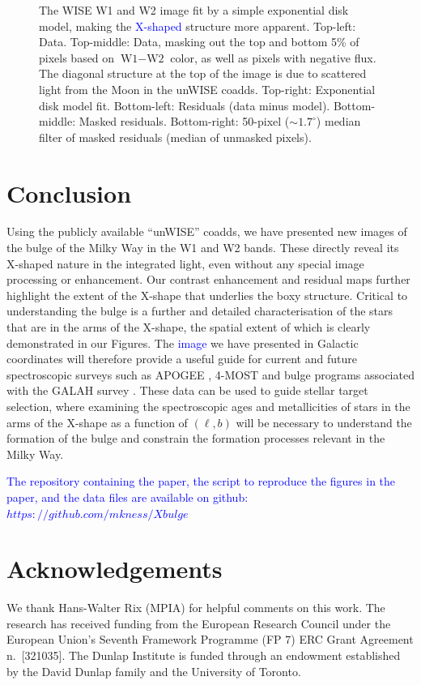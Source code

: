 \documentclass[12pt, preprint]{aastex}
\begin{document}
\begin{figure}[h!]
\caption{%
  The WISE W1 and W2 image fit by a simple exponential disk
  model, making the \textcolor{blue}{X-shaped} structure more apparent.
  Top-left: Data.  Top-middle: Data, masking out the top and bottom 5\%
  of pixels based on $\textrm{W1} - \textrm{W2}$ color, as well as pixels with negative flux.  The diagonal structure
  at the top of the image is due to scattered light from the Moon in the unWISE coadds.
  Top-right: Exponential disk model fit.
  Bottom-left: Residuals (data minus model).  Bottom-middle: Masked residuals.
  Bottom-right: 50-pixel ($\sim 1.7^{\circ}$) median filter of masked residuals (median of unmasked
  pixels).
  }
\label{fig:modfit}
\end{figure}




\section{Conclusion}

Using the publicly available ``unWISE'' coadds, we have presented new images of the bulge of the Milky Way in the W1 and W2 bands.  These directly reveal its X-shaped nature in the integrated light, even without any special image processing or enhancement. Our contrast enhancement and residual maps further highlight the extent of the X-shape that underlies the boxy structure. Critical to understanding the bulge is a further and detailed characterisation of the stars that are in the arms of the X-shape, the spatial extent of which is clearly demonstrated in our Figures. The \textcolor{blue}{image} we have presented in Galactic coordinates will therefore provide a useful guide for current and future spectroscopic surveys such as APOGEE \citep{Majewski2015}, 4-MOST \citep{4most} and bulge programs associated with the GALAH survey \citep{deSilva2015}. These data can be used to guide stellar target selection, where examining the spectroscopic ages \citep[e.g.][]{Martig2016, Ness2016} and metallicities of stars in the arms of the X-shape as a function of $(\ell,b)$ will be necessary to understand the formation of the bulge and constrain the formation processes relevant in the Milky Way. 

\textcolor{blue}{The repository containing the paper, the script to reproduce the figures in the paper, and the data files are available on github: $https://github.com/mkness/Xbulge$}


\section{Acknowledgements} 
We thank Hans-Walter Rix (MPIA) for helpful comments on this work. 
The research has received funding from the European Research Council under the European Union's Seventh Framework Programme (FP 7) ERC Grant Agreement n.~[321035].
%
The Dunlap Institute is funded through an endowment established by the David Dunlap family and the University of Toronto.
\end{document}

